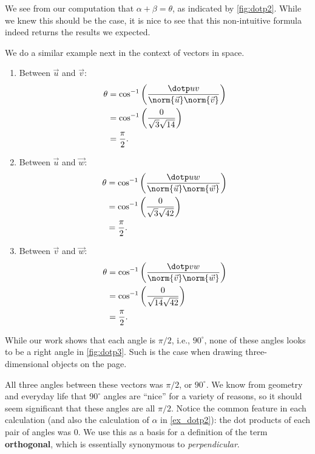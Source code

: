 We see from our computation that $\alpha + \beta = \theta$, as indicated by \autoref{fig:dotp2}. While we knew this should be the case, it is nice to see that this non-intuitive formula indeed returns the results we expected.

We do a similar example next in the context of vectors in space.


{\begin{enumerate}
	\item Between $\vec u$ and $\vec v$:
	\begin{align*}
		\theta &= \cos^{-1}\left(\frac{\dotp uv}{\norm{\vec u}\norm{\vec v}}\right)\\
		&= \cos^{-1}\left(\frac{0}{\sqrt{3}\sqrt{14}}\right)\\
		&= \frac{\pi}2.
	\end{align*}
	\item	Between $\vec u$ and $\vec w$:
	\begin{align*}
		\theta &= \cos^{-1}\left(\frac{\dotp uw}{\norm{\vec u}\norm{\vec w}}\right)\\
		&= \cos^{-1}\left(\frac{0}{\sqrt{3}\sqrt{42}}\right)\\
		&= \frac{\pi}2.
	\end{align*}
	\item	Between $\vec v$ and $\vec w$:
	\begin{align*}
		\theta &= \cos^{-1}\left(\frac{\dotp vw}{\norm{\vec v}\norm{\vec w}}\right)\\
		&= \cos^{-1}\left(\frac{0}{\sqrt{14}\sqrt{42}}\right)\\
		&= \frac{\pi}2.
	\end{align*}
\end{enumerate}
While our work shows that each angle is $\pi/2$, i.e.,  $90^\circ$, none of these angles looks to be a right angle in \autoref{fig:dotp3}. Such is the case when drawing three-dimensional objects on the page.}

All three angles between these vectors was $\pi/2$, or $90^\circ$. We know from geometry and everyday life that $90^\circ$ angles are ``nice'' for a variety of reasons, so it should seem significant that these angles are all $\pi/2$. Notice the common feature in each calculation (and also the calculation of $\alpha$ in \autoref{ex_dotp2}): the dot products of each pair of angles was 0. We use this as a basis for a definition of the term \textbf{orthogonal}, which is essentially synonymous to \textit{perpendicular}.

